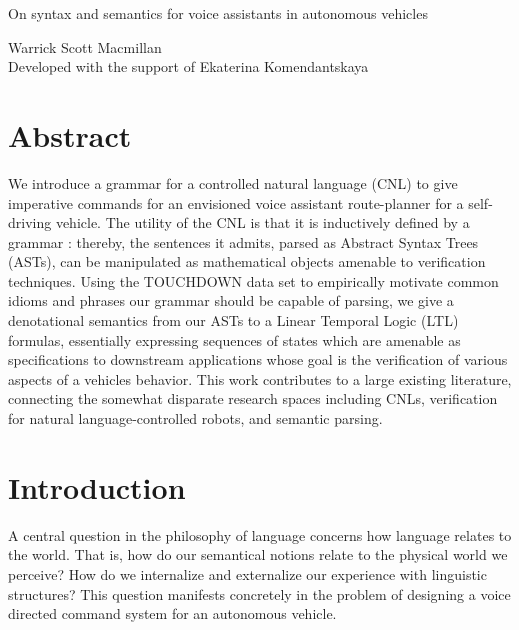 \documentclass[a4paper, 11pt]{article}
\begin{document}

\begin{titlepage}

\vspace*{1cm}

\begin{center} \Large On syntax and semantics
  for voice assistants in autonomous vehicles  \\ 

\vspace{1.5cm}

\large Warrick Scott Macmillan  \\
\large Developed with the support of Ekaterina Komendantskaya
\end{center}


\end{titlepage}

\section{Abstract} 

We introduce a grammar for a controlled natural language (CNL) to give
imperative commands for an envisioned voice assistant route-planner for a
self-driving vehicle. The utility of the CNL is that it is inductively defined
by a grammar : thereby, the sentences it admits, parsed as Abstract Syntax Trees
(ASTs), can be manipulated as mathematical objects amenable to verification
techniques. Using the TOUCHDOWN data set to empirically motivate common idioms
and phrases our grammar should be capable of parsing, we give a denotational
semantics from our ASTs to a Linear Temporal Logic (LTL) formulas, essentially
expressing sequences of states which are amenable as specifications to
downstream applications whose goal is the verification of various aspects of a
vehicles behavior. This work contributes to a large existing literature,
connecting the somewhat disparate research spaces including CNLs, verification
for natural language-controlled robots, and semantic parsing.

\section{Introduction}

A central question in the philosophy of language concerns how language relates
to the world. That is, how do our semantical notions relate to the physical
world we perceive? How do we internalize and externalize our experience with
linguistic structures? This question manifests concretely in the problem of
designing a voice directed command system for an autonomous vehicle.
\end{document}
